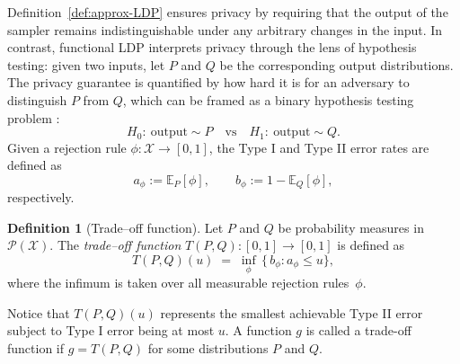 \documentclass[accepted]{article}
\theoremstyle{plain} %
\theoremstyle{definition}
\newtheorem{definition}{Definition}[section]
\theoremstyle{remark}
\newcommand{\X}{\mathcal{X}}
\begin{document}
Definition~\ref{def:approx-LDP} ensures privacy by requiring that the output of the sampler remains indistinguishable under any arbitrary changes in the input. In contrast, functional LDP \cite{dong2022gaussian} interprets privacy through the lens of hypothesis testing: given two inputs, let \(P\) and \(Q\) be the corresponding output distributions. The privacy guarantee is quantified by how hard it is for an adversary to distinguish \(P\) from \(Q\), which can be framed as a binary hypothesis testing problem \citep{wasserman2010statistical,kairouz2015composition}:
\[
H_0:\ \text{output} \sim P 
\quad\text{vs}\quad 
H_1:\ \text{output} \sim Q.
\]
Given a rejection rule \(\phi:\mathcal{X}\rightarrow[0,1]\), the Type I and Type II error rates  are defined as
\[
    a_\phi := \mathbb{E}_{P}[\phi],
    \qquad
    b_\phi := 1 - \mathbb{E}_{Q}[\phi],
\]
respectively.

\begin{definition}[Trade--off function]\label{def:trade-off}
Let \(P\) and \(Q\) be probability measures in $\mathcal{P}(\X)$. 
The \emph{trade--off function}
\(T(P,Q):[0,1]\to[0,1]\) is defined as
\[
   T(P,Q)(u)
   \;=\;
   \inf_{\phi}\,\bigl\{\,b_\phi : a_\phi \le u \bigr\},
\]
where the infimum is taken over all measurable rejection rules~\(\phi\).
\end{definition}

Notice that \(T(P,Q)(u)\) represents the smallest achievable Type II error
subject to Type I error being at most \(u\). A function $g$ is called a trade-off function if $g = T(P,Q)$ for some distributions $P$ and $Q$.
\end{document}
